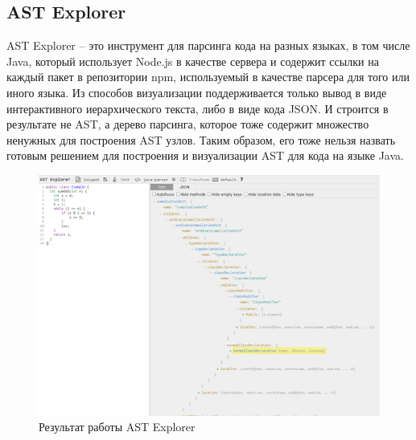 \subsection{AST Explorer} \label{ch2:subsec-title-abbr}
AST Explorer – это инструмент для парсинга кода на разных языках, в том числе Java, который использует Node.js в качестве сервера и содержит ссылки на каждый пакет в репозитории npm, используемый в качестве парсера для того или иного языка.
Из способов визуализации поддерживается только вывод в виде интерактивного иерархического текста, либо в виде кода JSON. И строится в результате не AST, а дерево парсинга, которое тоже содержит множество ненужных для построения AST узлов.
Таким образом, его тоже нельзя назвать готовым решением для построения и визуализации AST для кода на языке Java.
\begin{figure}[ht!] 
	\center
	\includegraphics [scale=0.27] {my_folder/images/my/9}
	\caption{Результат работы AST Explorer} 
	\label{fig:9}  
\end{figure}
